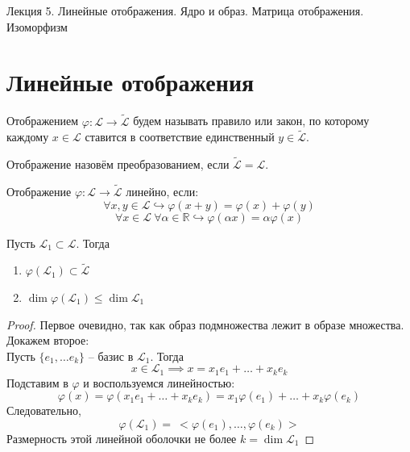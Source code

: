 \documentclass[11pt]{article}
\begin{document}
\begin{titlepage}
    \centering
    \vspace*{\fill}  %

    {\Huge Лекция 5. Линейные отображения. Ядро и образ. Матрица отображения. Изоморфизм
    \par}

    \vspace*{\fill}  %
\end{titlepage}

\setcounter{page}{1}

\section{Линейные отображения}

\begin{definition}
  Отображением $\varphi \colon \mathcal{L} \to \widetilde{\mathcal{L}}$ будем
  называть правило или закон, по которому каждому $x \in \mathcal{L}$ ставится 
  в соответствие единственный $y \in \widetilde{\mathcal{L}}$.
\end{definition}

\begin{definition}
  Отображение назовём преобразованием, если $\widetilde{\mathcal{L}} = \mathcal{L}$.
\end{definition}

\begin{definition}
  Отображение $\varphi \colon \mathcal{L} \to \widetilde{\mathcal{L}}$ линейно, если:
  \[\forall x, y \in \mathcal{L} \hookrightarrow \varphi (x + y) = \varphi (x) + \varphi (y)\]
  \[\forall x \in \mathcal{L} \ \forall \alpha \in \mathbb{R} \hookrightarrow \varphi (\alpha x) = \alpha \varphi (x)\]
\end{definition}

\begin{lemma}
  Пусть $\mathcal{L}_1 \subset \mathcal{L}$. Тогда 
  \begin{enumerate}
    \item $\varphi(\mathcal{L}_1) \subset \widetilde{\mathcal{L}}$
    \item $\dim \varphi (\mathcal{L}_1) \leq \dim \mathcal{L}_1$
  \end{enumerate}
\end{lemma}

\begin{proof}
  Первое очевидно, так как образ подмножества лежит в образе множества. \\
  Докажем второе: \\
  Пусть $\{e_1, \dots e_k\}$ -- базис в $\mathcal{L}_1$. Тогда
  \[x \in \mathcal{L}_1 \implies x = x_1e_1 + \dots + x_ke_k\]
  Подставим в $\varphi$ и воспользуемся линейностью:
  \[\varphi (x) = \varphi (x_1e_1 + \dots + x_ke_k) = x_1 \varphi (e_1) + \dots + x_k \varphi (e_k)\]
  Следовательно, 
  \[\varphi (\mathcal{L}_1) = \ <\varphi (e_1), \dots, \varphi (e_k)>\]
  Размерность этой линейной оболочки не более $k = \dim \mathcal{L}_1$
\end{proof}
\end{document}

